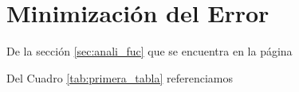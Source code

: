 \chapter{Minimización del Error} \label{cap:min_error}
	\lipsum \lipsum[3]
	
	De la sección \ref{sec:anali_fuc} que se encuentra en la página \pageref{sec:anali_fuc} \lipsum[1]
	
	Del Cuadro \ref{tab:primera_tabla} referenciamos \lipsum[1]